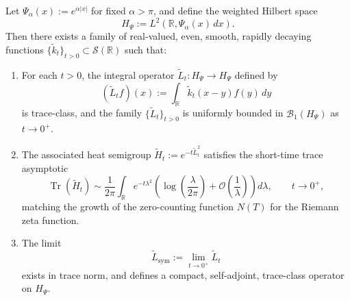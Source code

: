 \begin{lemma}
\label{lem:heat_kernel_from_trace_asymptotics}
Let $\Psi_\alpha(x) := e^{\alpha|x|}$ for fixed $\alpha > \pi$, and define the weighted Hilbert space
\[
H_\Psi := L^2(\mathbb{R}, \Psi_\alpha(x) \, dx).
\]
Then there exists a family of real-valued, even, smooth, rapidly decaying functions $\{ \tilde{k}_t \}_{t > 0} \subset \mathcal{S}(\mathbb{R})$ such that:

\begin{enumerate}
\item For each $t > 0$, the integral operator $\tilde{L}_t : H_\Psi \to H_\Psi$ defined by
\[
(\tilde{L}_t f)(x) := \int_{\mathbb{R}} \tilde{k}_t(x - y) f(y) \, dy
\]
is trace-class, and the family $\{ \tilde{L}_t \}_{t > 0}$ is uniformly bounded in $\mathcal{B}_1(H_\Psi)$ as $t \to 0^+$.

\item The associated heat semigroup $\tilde{H}_t := e^{-t \tilde{L}_t^2}$ satisfies the short-time trace asymptotic
\[
\operatorname{Tr}(\tilde{H}_t) \sim \frac{1}{2\pi} \int_{\mathbb{R}} e^{-t \lambda^2} \left( \log\left( \frac{\lambda}{2\pi} \right) + \mathcal{O}\left( \frac{1}{\lambda} \right) \right) d\lambda, \qquad t \to 0^+,
\]
matching the growth of the zero-counting function $N(T)$ for the Riemann zeta function.

\item The limit
\[
\tilde{L}_{\mathrm{sym}} := \lim_{t \to 0^+} \tilde{L}_t
\]
exists in trace norm, and defines a compact, self-adjoint, trace-class operator on $H_\Psi$.
\end{enumerate}
\end{lemma}
